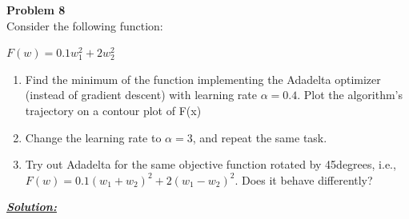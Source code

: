 \documentclass{article}
\begin{document}
\newpage
\noindent \textbf{Problem 8} \\
Consider the following function:
\begin{center}
    $ F(w) = 0.1w_1^2 + 2w_2^2$
\end{center}

\begin{enumerate}
    \item Find the minimum of the function implementing the Adadelta optimizer (instead of
            gradient descent) with learning rate $\alpha = 0.4$. Plot the algorithm’s trajectory on a contour
            plot of F(x)
    \item Change the learning rate to $\alpha = 3$, and repeat the same task.
    \item Try out Adadelta for the same objective function rotated by 45degrees, i.e., 
            $ F(w) = 0.1(w_1+w_2)^2 + 2(w_1-w_2)^2$. Does it behave differently?\\ 
\end{enumerate} 

\noindent \underline{\textbf{\textit{Solution:}}} 
\end{document}
